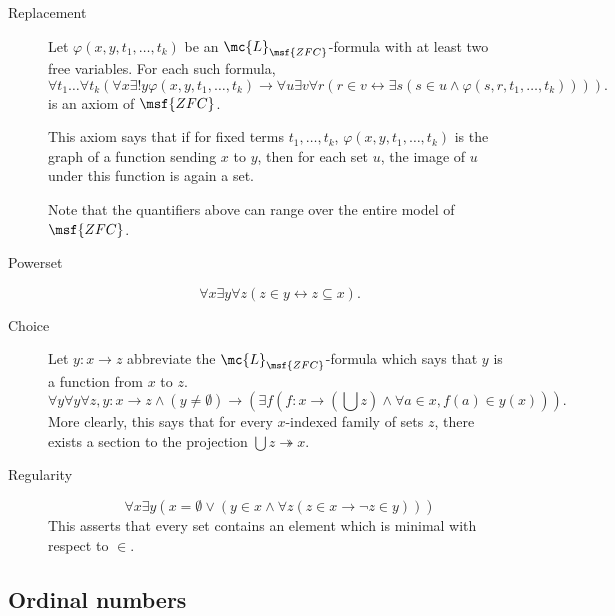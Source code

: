 \documentclass[11pt]{article}
\begin{document}
{\begin{description}
\item[Replacement] \label{zfc-replacement}
    Let $\varphi(x,y, t_1, \dots, t_k)$ be an $\mc{L}_{\msf{ZFC}}$-formula with at least two free variables. For each such formula,
  $$
\forall t_1 \dots \forall t_k (\forall x \exists! y \varphi(x,y,t_1, \dots, t_k) \to \forall u \exists v \forall r( r \in v \leftrightarrow \exists s (s \in u \wedge \varphi(s,r,t_1, \dots, t_k)))).
  $$
  is an axiom of $\msf{ZFC}$.

  This axiom says that if for fixed terms $t_1, \dots, t_k$, $\varphi(x,y,t_1, \dots, t_k)$ is the graph of a function sending $x$ to $y$, then for each set $u$, the image of $u$ under this function is again a set.

  Note that the quantifiers above can range over the entire model of $\msf{ZFC}$.

\item[Powerset] \label{zfc-powerset}
  $$
\forall x \exists y \forall z (z \in y \leftrightarrow z \subseteq x).
$$
\item[Choice] \label{zfc-choice} Let $y : x \to z$ abbreviate the $\mc{L}_{\msf{ZFC}}$-formula which says that $y$ is a function from $x$ to $z$.
  $$
\forall y \forall y \forall z, y : x \to z \wedge (y \neq \emptyset) \rightarrow \left( \exists f (f : x \to (\bigcup z) \wedge \forall a \in x, f(a) \in y(x)) \right).
  $$
More clearly, this says that for every $x$-indexed family of sets $z$, there exists a section to the projection $\bigcup z \twoheadrightarrow x$.
\item[Regularity] \label{zfc-regularity}
  $$
\forall x \exists y  (x = \emptyset \lor (y \in x \wedge \forall z (z \in x \to \neg z \in y)))
$$
This asserts that every set contains an element which is minimal with respect to $\in$.
\end{description}
}

\subsection{Ordinal numbers}
\end{document}
